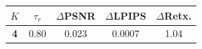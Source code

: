\begin{tabular}{ccccc}
\toprule
$K$ & $\tau_r$ & $\Delta$PSNR & $\Delta$LPIPS & $\Delta$Retx. \\
\midrule
\bfseries 4 & 0.80 & 0.023 & 0.0007 & 1.04 \\
\bottomrule
\end{tabular}
